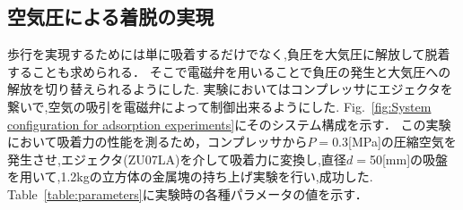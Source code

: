 \documentclass[uplatex,dvipdfmx]{jlreq}
\begin{document}

\subsection{空気圧による着脱の実現}
歩行を実現するためには単に吸着するだけでなく,負圧を大気圧に解放して脱着することも求められる．
そこで電磁弁を用いることで負圧の発生と大気圧への解放を切り替えられるようにした.
実験においてはコンプレッサにエジェクタを繋いで,空気の吸引を電磁弁によって制御出来るようにした.
Fig.~\ref{fig:System configuration for adsorption experiments}にそのシステム構成を示す．
この実験において吸着力の性能を測るため，コンプレッサから$P=0.3$[MPa]の圧縮空気を発生させ,エジェクタ(ZU07LA)を介して吸着力に変換し,直径$d=$50[mm]の吸盤を用いて,1.2kgの立方体の金属塊の持ち上げ実験を行い,成功した.
Table~\ref{table:parameters}に実験時の各種パラメータの値を示す．
\end{document}
